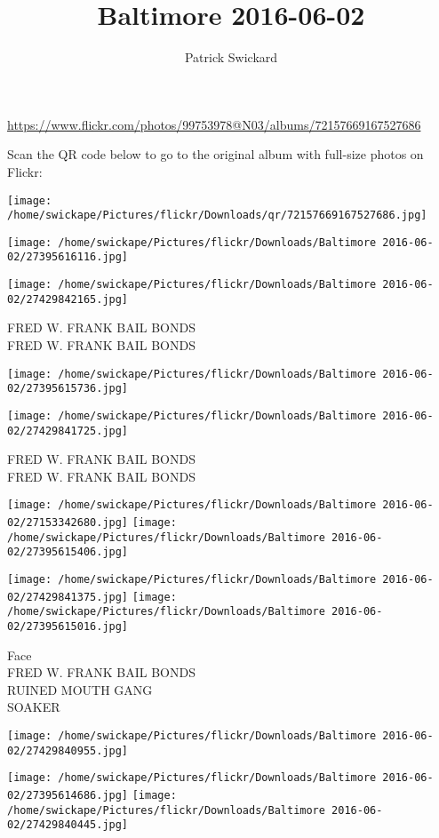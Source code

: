 \documentclass[10pt,letterpaper]{article}
\title{Baltimore 2016-06-02}
\author{Patrick Swickard}
\date{}
\begin{document}
\maketitle

\url{https://www.flickr.com/photos/99753978@N03/albums/72157669167527686}

Scan the QR code below to go to the original album with full-size photos on Flickr:

\texttt{[image: /home/swickape/Pictures/flickr/Downloads/qr/72157669167527686.jpg]}
\pagebreak

\texttt{[image: /home/swickape/Pictures/flickr/Downloads/Baltimore 2016-06-02/27395616116.jpg]}

\vspace{0.25in}
\texttt{[image: /home/swickape/Pictures/flickr/Downloads/Baltimore 2016-06-02/27429842165.jpg]}

FRED W. FRANK BAIL BONDS\\
FRED W. FRANK BAIL BONDS
\pagebreak

\texttt{[image: /home/swickape/Pictures/flickr/Downloads/Baltimore 2016-06-02/27395615736.jpg]}

\vspace{0.25in}
\texttt{[image: /home/swickape/Pictures/flickr/Downloads/Baltimore 2016-06-02/27429841725.jpg]}

FRED W. FRANK BAIL BONDS\\
FRED W. FRANK BAIL BONDS
\pagebreak

\texttt{[image: /home/swickape/Pictures/flickr/Downloads/Baltimore 2016-06-02/27153342680.jpg]}
\texttt{[image: /home/swickape/Pictures/flickr/Downloads/Baltimore 2016-06-02/27395615406.jpg]}

\texttt{[image: /home/swickape/Pictures/flickr/Downloads/Baltimore 2016-06-02/27429841375.jpg]}
\texttt{[image: /home/swickape/Pictures/flickr/Downloads/Baltimore 2016-06-02/27395615016.jpg]}

Face\\
FRED W. FRANK BAIL BONDS\\
RUINED MOUTH GANG\\
SOAKER
\pagebreak

\texttt{[image: /home/swickape/Pictures/flickr/Downloads/Baltimore 2016-06-02/27429840955.jpg]}

\vspace{0.25in}
\texttt{[image: /home/swickape/Pictures/flickr/Downloads/Baltimore 2016-06-02/27395614686.jpg]}
\texttt{[image: /home/swickape/Pictures/flickr/Downloads/Baltimore 2016-06-02/27429840445.jpg]}
\end{document}
